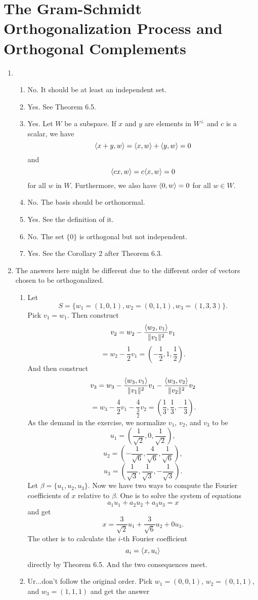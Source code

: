 \section{The Gram-Schmidt Orthogonalization Process and Orthogonal Complements}
\begin{enumerate}
\item \begin{enumerate}
\item No. It should be at least an independent set.
\item Yes. See Theorem 6.5.
\item Yes. Let $W$ be a subspace. If $x$ and $y$ are elements in $W^{\perp }$ and $c$ is a scalar, we have 
\[\langle x+y,w\rangle =\langle x,w\rangle +\langle y,w\rangle =0\]
and 
\[\langle cx,w\rangle =c\langle x,w\rangle =0\]
for all $w$ in $W$. 
Furthermore, we also have $\langle 0, w\rangle =0$ for all $w\in W$.
\item No. The basis should be orthonormal.
\item Yes. See the definition of it.
\item No. The set $\{0\}$ is orthogonal but not independent.
\item Yes. See the Corollary 2 after Theorem 6.3.
\end{enumerate}
\item The answers here might be different due to the different order of vectors chosen to be orthogonalized. \begin{enumerate}
\item Let 
\[S=\{w_1=(1,0,1),w_2=(0,1,1),w_3=(1,3,3)\}.\]
Pick $v_1=w_1$. Then construct 
\[v_2=w_2-\frac{\langle w_2,v_1\rangle}{\|v_1\|^2}v_1\]
\[=w_2-\frac{1}{2}v_1=(-\frac{1}{2},1,\frac{1}{2}).\]
And then construct 
\[v_3=w_3-\frac{\langle w_3,v_1\rangle}{\|v_1\|^2}v_1-\frac{\langle w_3,v_2\rangle}{\|v_2\|^2}v_2\]
\[=w_3-\frac{4}{2}v_1-\frac{4}{\frac{3}{2}}v_2=(\frac{1}{3},\frac{1}{3},-\frac{1}{3}).\]
As the demand in the exercise, we normalize $v_1$, $v_2$, and $v_3$ to be 
\[u_1=(\frac{1}{\sqrt{2}},0,\frac{1}{\sqrt{2}}),\]
\[u_2=(-\frac{1}{\sqrt{6}},\frac{4}{\sqrt{6}},\frac{1}{\sqrt{6}}),\]
\[u_3=(\frac{1}{\sqrt{3}},\frac{1}{\sqrt{3}},-\frac{1}{\sqrt{3}}).\]
Let $\beta =\{u_1,u_2,u_3\}$. Now we have two ways to compute the Fourier coefficients of $x$ relative to $\beta $. One is to solve the system of equations 
\[a_1u_1+a_2u_2+a_3u_3=x\]
and get 
\[x=\frac{3}{\sqrt{2}}u_1+\frac{3}{\sqrt{6}}u_2+0u_3.\]
The other is to calculate the $i$-th Fourier coefficient 
\[a_i=\langle x,u_i\rangle \]
directly by Theorem 6.5. And the two consequences meet.
\item Ur...don't follow the original order. Pick $w_1=(0,0,1)$, $w_2=(0,1,1)$, and $w_3=(1,1,1)$ and get the answer 

\end{enumerate}
\end{enumerate}
